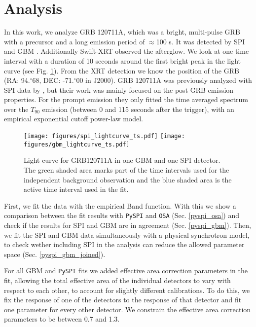 \documentclass[twocolumn,traditabstract]{aa}
\def\fdg{\hbox{$.\!\!^\circ$}}          %
\begin{document}
\section{Analysis}
\label{analysis}
In this work, we analyze GRB 120711A, which was a bright, multi-pulse GRB with a precursor and a long emission period of $\approx$100 s. It was detected by SPI and GBM \citep{GCN_integral, GCN_gbm}. Additionally Swift-XRT \citep{GCN_swift} observed the afterglow. We look at one time interval with a duration of 10 seconds around the first bright peak in the light curve (see Fig. \ref{fig:time_selection}). From the XRT detection we know the position of the GRB (RA: 94\fdg68, DEC: -71\fdg00 in J2000). GRB 120711A was previously analyzed with SPI data by \citet{Martin-Carrillo-2014}, but their work was mainly focused on the post-GRB emission properties. For the prompt emission they only fitted the time averaged spectrum over the $T_{90}$ emission (between 0 and 115 seconds after the trigger), with an empirical exponential cutoff power-law model.

\begin{figure}
  \begin{centering}
    \texttt{[image: figures/spi\_lightcurve\_ts.pdf]}
    \texttt{[image: figures/gbm\_lightcurve\_ts.pdf]}
    \caption{Light curve for GRB120711A in one GBM and one SPI detector. The green shaded area marks part of the time intervals used for the independent background observation and the blue shaded area is the active time interval used in the fit.}
    \label{fig:time_selection}
  \end{centering}
\end{figure}

First, we fit the data with the empirical Band function. With this we show a comparison between the fit results with {\tt PySPI} and {\tt OSA} (Sec. \ref{pyspi_osa}) and check if the results for SPI and GBM are in agreement (Sec. \ref{pyspi_gbm}). Then, we fit the SPI and GBM data simultaneously with a physical synchrotron model, to check wether including SPI in the analysis can reduce the allowed parameter space (Sec. \ref{pyspi_gbm_joined}).

For all GBM and {\tt PySPI} fits we added effective area correction parameters in the fit, allowing the total effective area of the individual detectors to vary with respect to each other, to account for slightly different calibrations. To do this, we fix the response of one of the detectors to the response of that detector and fit one parameter for every other detector. We constrain the effective area correction parameters to be between 0.7 and 1.3.
\end{document}
